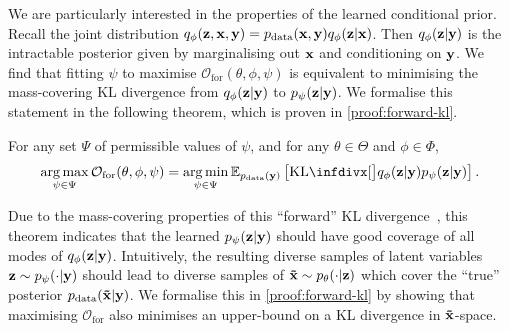 We are particularly interested in the properties of the learned conditional prior.
Recall the joint distribution $q_\phi({\mathbf{z}}, {\mathbf{x}}, {\mathbf{y}}) = p_{\rm{data}}({\mathbf{x}},
{\mathbf{y}})q_\phi({\mathbf{z}}|{\mathbf{x}})$. Then $q_\phi({\mathbf{z}}|{\mathbf{y}})$ is the intractable
posterior given by marginalising out ${\mathbf{x}}$ and conditioning on ${\mathbf{y}}$. We
find that fitting $\psi$ to maximise $\mathcal{O}_\mathrm{for}(\theta,
\phi, \psi)$ is equivalent to minimising the mass-covering KL divergence
from $q_\phi({\mathbf{z}}|{\mathbf{y}})$ to $p_\psi({\mathbf{z}}|{\mathbf{y}})$. We formalise
this statement in the following theorem, which is proven in
\cref{proof:forward-kl}.
\begin{theorem} \label{theorem:forward-kl} For any set $\Psi$ of
  permissible values of $\psi$, and for any $\theta\in\Theta$ and
  $\phi\in\Phi$,
  \begin{equation} \label{eq:forward-theorem}
    \argmax_{\psi \in \Psi} \mathcal{O}_\mathrm{for}(\theta, \phi, \psi) = \argmin_{\psi \in \Psi} \EX_{\pdata(\rvy)} \left[ \kl[\big]{ q_\phi(\rvz|\rvy) }{ p_\psi(\rvz|\rvy) } \right].
  \end{equation}
\end{theorem}
Due to the mass-covering properties of this ``forward'' KL
divergence~\citep{bishop2006pattern}, this theorem indicates that 
the learned $p_\psi({\mathbf{z}}|{\mathbf{y}})$ should have good coverage of all
modes of $q_\phi({\mathbf{z}}|{\mathbf{y}})$. Intuitively, the resulting diverse samples of
latent variables ${\mathbf{z}}\sim p_\psi(\cdot|{\mathbf{y}})$ should lead to
diverse samples of $\mathbf{\tilde{x}}{} \sim p_\theta(\cdot|{\mathbf{z}})$ which cover the
``true'' posterior $p_{\rm{data}}(\mathbf{\tilde{x}}{}|{\mathbf{y}})$. We formalise this in
\cref{proof:forward-kl} by showing that maximising $\mathcal{O}_\mathrm{for}$
also minimises an upper-bound on a KL divergence in $\mathbf{\tilde{x}}{}$-space.

